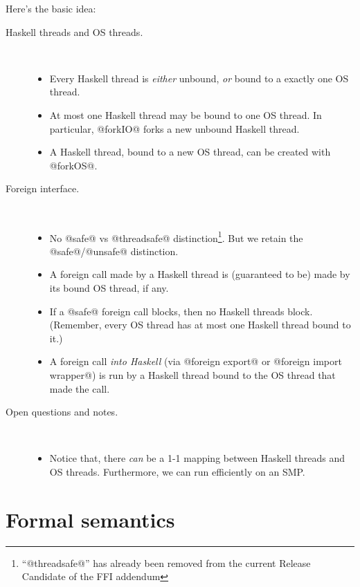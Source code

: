 \documentclass{article}
\begin{document}
Here's the basic idea:
\begin{description}
\item[Haskell threads and OS threads.] \mbox{}\\
\begin{itemize}
\item Every Haskell thread is \emph{either} unbound, \emph{or} bound to a exactly one OS thread.  

\item At most one Haskell thread may be bound to one OS thread.
In particular, @forkIO@ forks a new unbound Haskell thread.

\item A Haskell thread, bound to a new OS thread, can be created with @forkOS@.

\end{itemize}

\item[Foreign interface.] \mbox{}\\
\begin{itemize}
\item No @safe@ vs @threadsafe@ distinction\footnote{``@threadsafe@'' has already
been removed from the current Release Candidate of the FFI addendum}. But we retain
the @safe@/@unsafe@ distinction.
\item A foreign call made by a Haskell thread is (guaranteed to be) made by its bound OS thread, if
any.

\item If a @safe@ foreign call blocks, then no Haskell threads block.  (Remember, every OS thread
has at most one Haskell thread bound to it.)

\item A foreign call \emph{into Haskell} (via @foreign export@ or @foreign import wrapper@) is 
run by a Haskell thread bound to the OS thread that made the call.
\end{itemize}


\item[Open questions and notes.] \mbox{}\\
\begin{itemize}
\item Notice that, there \emph{can} be a 1-1 mapping between Haskell threads
and OS threads.  Furthermore, we can run efficiently on an SMP.
\end{itemize}
\end{description}


\section{Formal semantics}
\end{document}

